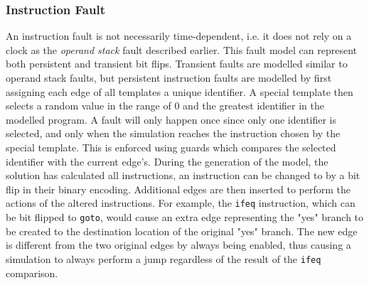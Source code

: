 \subsubsection{Instruction Fault}
An instruction fault is not necessarily time-dependent, i.e. it does not rely on a clock as the \textit{operand stack} fault described earlier. This fault model can represent both persistent and transient bit flips. Transient faults are modelled similar to operand stack faults, but persistent instruction faults are modelled by first assigning each edge of all templates a unique identifier. A special template then selects a random value in the range of $0$ and the greatest identifier in the modelled program. A fault will only happen once since only one identifier is selected, and only when the simulation reaches the instruction chosen by the special template. This is enforced using guards which compares the selected identifier with the current edge's. During the generation of the model, the solution has calculated all instructions, an instruction can be changed to by a bit flip in their binary encoding. Additional edges are then inserted to perform the actions of the altered instructions. For example, the \texttt{ifeq} instruction, which can be bit flipped to \texttt{goto}, would cause an extra edge representing the "yes" branch to be created to the destination location of the original "yes" branch. The new edge is different from the two original edges by always being enabled, thus causing a simulation to always perform a jump regardless of the result of the \texttt{ifeq} comparison.